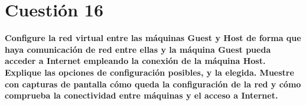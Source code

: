 \documentclass[a4paper,11pt]{article}
\newenvironment{answer}{%
\begin{list}{}{%
}%
\item[]}{\end{list}}
\begin{document}
\section{Cuestión 16}
\textbf{Configure la red virtual entre las máquinas Guest y Host de forma que haya comunicación de red entre ellas y 
la máquina Guest pueda acceder a Internet empleando la conexión de la máquina Host. Explique las opciones de
configuración posibles, y la elegida. Muestre con capturas de pantalla cómo queda la configuración de la red y cómo 
comprueba la conectividad entre máquinas y el acceso a Internet.}
\begin{answer}
 
\end{answer}
\printbibliography
\end{document}
